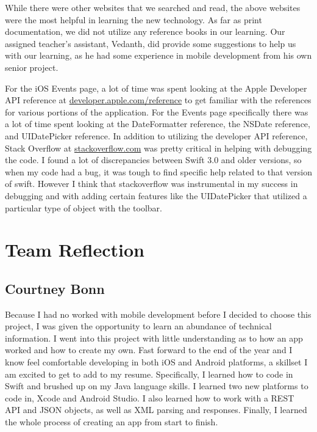 \documentclass[letterpaper,10pt,draftclsnofoot,onecolumn,titlepage]{IEEEtran}
\begin{document}
While there were other websites that we searched and read, the above websites were the most helpful in learning the new technology.
As far as print documentation, we did not utilize any reference books in our learning.
Our assigned teacher's assistant, Vedanth, did provide some suggestions to help us with our learning, as he had some experience in mobile development from his own senior project.

For the iOS Events page, a lot of time was spent looking at the Apple Developer API reference at \url{developer.apple.com/reference} to get familiar with the references for various portions of the application.
For the Events page specifically there was a lot of time spent looking at the DateFormatter reference, the NSDate reference, and UIDatePicker reference.
In addition to utilizing the developer API reference, Stack Overflow at \url{stackoverflow.com} was pretty critical in helping with debugging the code.
I found a lot of discrepancies between Swift 3.0 and older versions, so when my code had a bug, it was tough to find specific help related to that version of swift.
However I think that stackoverflow was instrumental in my success in debugging and with adding certain features like the UIDatePicker that utilized a particular type of object with the toolbar.

\section{Team Reflection}

	\subsection{Courtney Bonn}

		Because I had no worked with mobile development before I decided to choose this project, I was given the opportunity to learn an abundance of technical information.
		I went into this project with little understanding as to how an app worked and how to create my own.
		Fast forward to the end of the year and I know feel comfortable developing in both iOS and Android platforms, a skillset I am excited to get to add to my resume.
		Specifically, I learned how to code in Swift and brushed up on my Java language skills.
		I learned two new platforms to code in, Xcode and Android Studio.
		I also learned how to work with a REST API and JSON objects, as well as XML parsing and responses.
		Finally, I learned the whole process of creating an app from start to finish.
\end{document}
